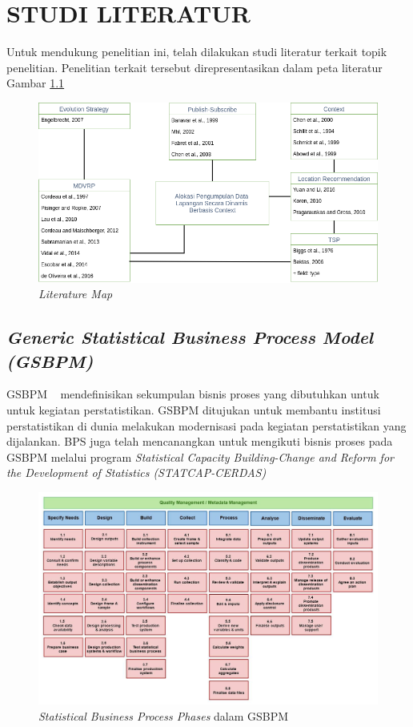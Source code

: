 \chapter{STUDI LITERATUR}
Untuk mendukung penelitian ini, telah \citep{klein_bias_1996} dilakukan studi literatur terkait topik penelitian. Penelitian terkait tersebut direpresentasikan dalam peta literatur Gambar \ref{fig:literature-map}

\begin{figure}
    \centering
    \includegraphics[width=1\textwidth]{../../Resources/Images/literature-map}
    \caption{\textit{Literature Map}}
    \label{fig:literature-map}
\end{figure}

\section{\textit{Generic Statistical Business Process Model (GSBPM)}}
GSBPM ~\cite{_gsbpm_????} mendefinisikan sekumpulan bisnis proses yang dibutuhkan untuk untuk kegiatan perstatistikan. GSBPM ditujukan untuk membantu institusi perstatistikan di dunia melakukan modernisasi pada kegiatan perstatistikan yang dijalankan. BPS juga telah mencanangkan untuk mengikuti bisnis proses pada GSBPM melalui program \textit{Statistical Capacity Building-Change and Reform for the Development of Statistics (STATCAP-CERDAS)}

\begin{figure}
    \centering
    \includegraphics[width=1\textwidth]{../../Resources/Images/gsbpm}
    \caption{\textit{Statistical Business Process Phases} dalam GSBPM}
    \label{fig:gsbpm2}
\end{figure}


